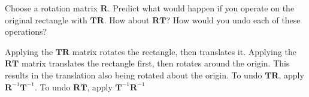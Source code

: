 Choose a rotation matrix $\boldsymbol{R}$. Predict what would happen if you operate on the original rectangle with $\boldsymbol{TR}$. How about $\boldsymbol{RT}$? How would you undo each of these operations?

\begin{solution}
    Applying the $\boldsymbol{TR}$ matrix rotates the rectangle, then translates it. Applying the $\boldsymbol{RT}$ matrix translates the rectangle first, then rotates around the origin. This results in the translation also being rotated about the origin. To undo $\boldsymbol{TR}$, apply $\boldsymbol{R}^{-1}\boldsymbol{T}^{-1}$. To undo $\boldsymbol{RT}$, apply $\boldsymbol{T}^{-1}\boldsymbol{R}^{-1}$
\end{solution}